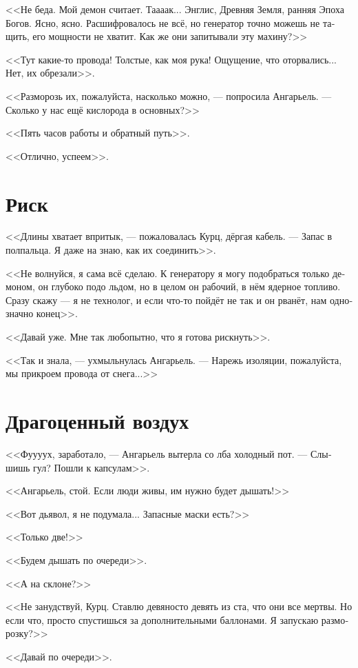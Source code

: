 \documentclass[a4paper,12pt,fleqn]{book}\usepackage{cooltooltips}\usepackage{polyglossia}\setdefaultlanguage[babelshorthands=true]{russian}\setotherlanguage{english}\defaultfontfeatures{Ligatures=TeX,Mapping=tex-text} \usepackage{xcolor}\definecolor{lightgray}{HTML}{bbbbbb}\color{lightgray}\newcommand{\ml}[3]{\textenglish{\textcolor{black}{#3}}}
\begin{document}
<<Не беда.
Мой демон считает.
Таааак...
Энглис, Древняя Земля, ранняя Эпоха Богов.
Ясно, ясно.
Расшифровалось не всё, но генератор точно можешь не тащить, его мощности не хватит.
Как же они запитывали эту махину?>>

<<Тут какие-то провода!
Толстые, как моя рука!
Ощущение, что оторвались...
Нет, их обрезали>>.

<<Разморозь их, пожалуйста, насколько можно, --- попросила Ангарьель.
--- Сколько у нас ещё кислорода в основных?>>

<<Пять часов работы и обратный путь>>.

<<Отлично, успеем>>.

\section{Риск}

<<Длины хватает впритык, --- пожаловалась Курц, дёргая кабель.
--- Запас в полпальца.
Я даже на знаю, как их соединить>>.

<<Не волнуйся, я сама всё сделаю.
К генератору я могу подобраться только демоном, он глубоко подо льдом, но в целом он рабочий, в нём ядерное топливо.
Сразу скажу --- я не технолог, и если что-то пойдёт не так и он рванёт, нам однозначно конец>>.

<<Давай уже.
Мне так любопытно, что я готова рискнуть>>.

<<Так и знала, --- ухмыльнулась Ангарьель.
--- Нарежь изоляции, пожалуйста, мы прикроем провода от снега...>>

\section{Драгоценный воздух}

<<Фуууух, заработало, --- Ангарьель вытерла со лба холодный пот.
--- Слышишь гул?
Пошли к капсулам>>.

<<Ангарьель, стой.
Если люди живы, им нужно будет дышать!>>

<<Вот дьявол, я не подумала...
Запасные маски есть?>>

<<Только две!>>

<<Будем дышать по очереди>>.

<<А на склоне?>>

<<Не занудствуй, Курц.
Ставлю девяносто девять из ста, что они все мертвы.
Но если что, просто спустишься за дополнительными баллонами.
Я запускаю разморозку?>>

<<Давай по очереди>>.
\end{document}
